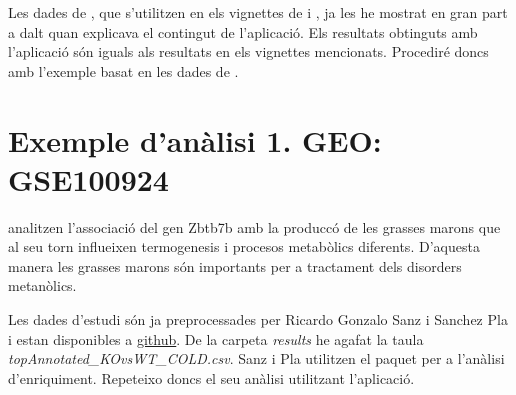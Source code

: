 Les dades de \cite{schmidt2008humoral}, que s'utilitzen en els vignettes de  i , ja les he mostrat en gran part a dalt quan explicava el contingut de l'aplicació. Els resultats obtinguts amb l'aplicació són iguals als resultats en els vignettes mencionats. Procediré doncs amb l'exemple basat en les dades de \cite{li2017zbtb7b} .

\section{Exemple d'anàlisi 1. GEO: GSE100924}

\cite{li2017zbtb7b} analitzen l'associació del gen Zbtb7b amb la produccó de les grasses marons que al seu torn influeixen termogenesis i procesos metabòlics diferents. D'aquesta manera les grasses marons són importants per a tractament dels disorders metanòlics.

Les dades d'estudi són ja preprocessades per Ricardo Gonzalo Sanz i Sanchez Pla i estan disponibles a \href{https://github.com/alexsanchezpla/StatisticalAnalysisOfMicroarrayData}{github}. De la carpeta \textit{results} he agafat la taula \textit{topAnnotated\_KOvsWT\_COLD.csv}. Sanz i Pla utilitzen el paquet  per a l'anàlisi d'enriquiment. Repeteixo doncs el seu anàlisi utilitzant l'aplicació. 



